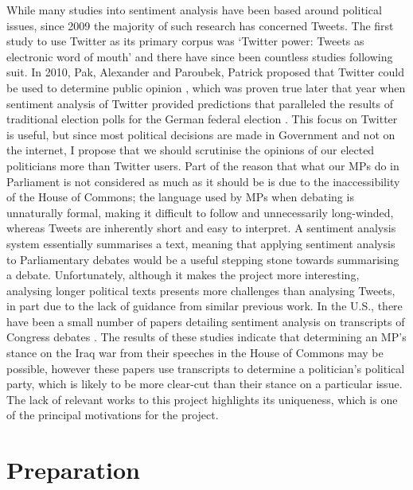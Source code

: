 \documentclass[12pt,a4paper,twoside,openright]{report}
\begin{document}
While many studies into sentiment analysis have been based around political issues, since 2009 the majority of such research has concerned Tweets. The first study to use Twitter as its primary corpus was `Twitter power: Tweets as electronic word of mouth' \cite{first_twitter} and there have since been countless studies following suit. In 2010, Pak, Alexander and Paroubek, Patrick proposed that Twitter could be used to determine public opinion \cite{twitter_as_a_corpus}, which was proven true later that year when sentiment analysis of Twitter provided predictions that paralleled the results of traditional election polls for the German federal election \cite{predicting_elections_twitter}.
\newline
\newline
This focus on Twitter is useful, but since most political decisions are made in Government and not on the internet, I propose that we should scrutinise the opinions of our elected politicians more than Twitter users. Part of the reason that what our MPs do in Parliament is not considered as much as it should be is due to the inaccessibility of the House of Commons; the language used by MPs when debating is unnaturally formal, making it difficult to follow and unnecessarily long-winded, whereas Tweets are inherently short and easy to interpret. A sentiment analysis system essentially summarises a text, meaning that applying sentiment analysis to Parliamentary debates would be a useful stepping stone towards summarising a debate. Unfortunately, although it makes the project more interesting, analysing longer political texts presents more challenges than analysing Tweets, in part due to the lack of guidance from similar previous work.
\newline
\newline
In the U.S., there have been a small number of papers detailing sentiment analysis on transcripts of Congress debates \cite{rep_dem_one} \cite{rep_dem_two}. The results of these studies indicate that determining an MP's stance on the Iraq war from their speeches in the House of Commons may be possible, however these papers use transcripts to determine a politician's political party, which is likely to be more clear-cut than their stance on a particular issue.
\newline
\newline
The lack of relevant works to this project highlights its uniqueness, which is one of the principal motivations for the project.

\chapter{Preparation}
\end{document}
